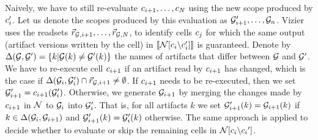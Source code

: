 Naively, we have to still re-evaluate $c_{i+1}, \ldots, c_{N}$ using the new scope produced by $c_i'$. Let us denote the scopes produced by this evaluation as
$\mathcal G_{i+1}', \ldots, \mathcal G_{n}$.
Vizier uses the readsets $\vec r_{\mathcal G, i+1}, \ldots, \vec r_{\mathcal G, N}$, to identify cells $c_{j}$ for which the same output (artifact versions written by the cell) in $\llbracket \mathcal N[c_i \backslash c_i'] \rrbracket$ is guaranteed. 
Denote by $\Delta(\mathcal G, \mathcal G') = \{ k |  \mathcal G(k) \neq \mathcal G'(k)\}$ the names of artifacts that differ between $\mathcal G$ and $\mathcal G'$. 
We have to re-execute cell $c_{i+1}$ if an artifact read by $c_{i+1}$ has changed, which is the case if $\Delta(\mathcal G_i, \mathcal G_i') \cap \vec r_{\mathcal G,i+1} \neq \emptyset$. If $c_{i+1}$ needs to be re-executed, then we set $\mathcal G_{i+1}' = c_{i+1}(\mathcal G_{i}')$. Otherwise, we generate $\mathcal G_{i+1}$ by merging the changes made by $c_{i+1}$ in $\mathcal N$ to $\mathcal G_{i}$ into $\mathcal G_{i}'$. That is, for all artifacts $k$ we set
$\mathcal G_{i+1}'(k) =   \mathcal G_{i+1}(k)$ if $k \in \Delta(\mathcal G_i, \mathcal G_{i+1})$
and $\mathcal G_{i+1}'(k) = \mathcal G_{i}'(k)$ otherwise.
 The same approach is applied to decide whether to evaluate or skip the remaining cells in $\mathcal N[c_i \backslash {c_i}']$.



